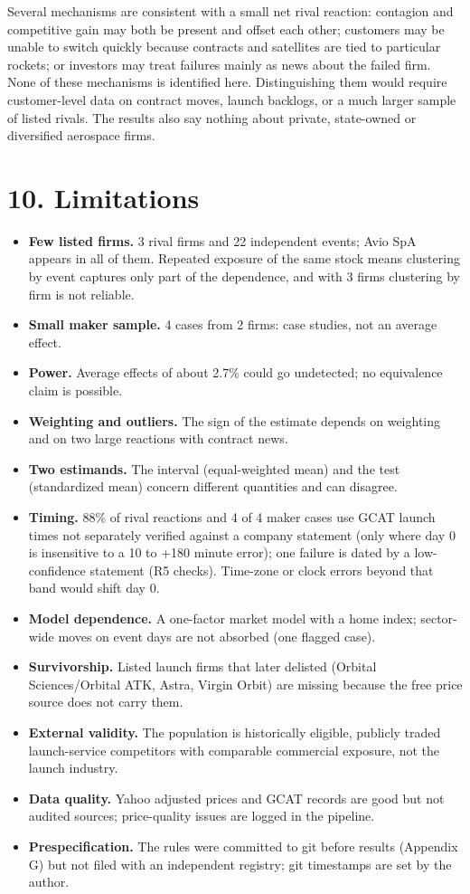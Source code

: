 \documentclass[12pt,a4paper]{article}
\begin{document}
Several mechanisms are consistent with a small net rival reaction: contagion and competitive gain may both be present and offset each other; customers may be unable to switch quickly because contracts and satellites are tied to particular rockets; or investors may treat failures mainly as news about the failed firm. None of these mechanisms is identified here. Distinguishing them would require customer-level data on contract moves, launch backlogs, or a much larger sample of listed rivals. The results also say nothing about private, state-owned or diversified aerospace firms.

\section*{10. Limitations}
\begin{itemize}[leftmargin=*,itemsep=2pt,topsep=4pt]
  \item \textbf{Few listed firms.} 3 rival firms and 22 independent events; Avio SpA appears in all of them. Repeated exposure of the same stock means clustering by event captures only part of the dependence, and with 3 firms clustering by firm is not reliable.
  \item \textbf{Small maker sample.} 4 cases from 2 firms: case studies, not an average effect.
  \item \textbf{Power.} Average effects of about 2.7\% could go undetected; no equivalence claim is possible.
  \item \textbf{Weighting and outliers.} The sign of the estimate depends on weighting and on two large reactions with contract news.
  \item \textbf{Two estimands.} The interval (equal-weighted mean) and the test (standardized mean) concern different quantities and can disagree.
  \item \textbf{Timing.} 88\% of rival reactions and 4 of 4 maker cases use GCAT launch times not separately verified against a company statement (only where day 0 is insensitive to a \textminus{}10 to +180 minute error); one failure is dated by a low-confidence statement (R5 checks). Time-zone or clock errors beyond that band would shift day 0.
  \item \textbf{Model dependence.} A one-factor market model with a home index; sector-wide moves on event days are not absorbed (one flagged case).
  \item \textbf{Survivorship.} Listed launch firms that later delisted (Orbital Sciences/Orbital ATK, Astra, Virgin Orbit) are missing because the free price source does not carry them.
  \item \textbf{External validity.} The population is historically eligible, publicly traded launch-service competitors with comparable commercial exposure, not the launch industry.
  \item \textbf{Data quality.} Yahoo adjusted prices and GCAT records are good but not audited sources; price-quality issues are logged in the pipeline.
  \item \textbf{Prespecification.} The rules were committed to git before results (Appendix G) but not filed with an independent registry; git timestamps are set by the author.
\end{itemize}
\end{document}
